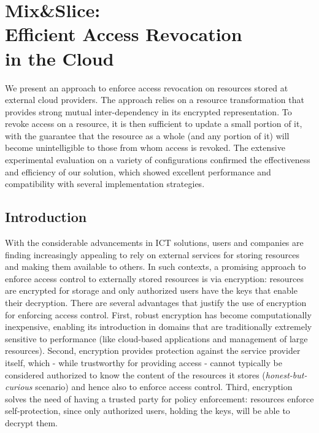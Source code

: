\chapter[Mix\&Slice]{Mix\&Slice:\\Efficient Access Revocation\\in the Cloud}\label{chap:ms}

We present an approach to enforce access revocation on resources stored at external cloud providers. The approach relies on a resource transformation that provides strong mutual inter-dependency in its encrypted representation. To revoke access on a resource, it is then sufficient to update a small portion of it, with the guarantee that the resource as a whole (and any portion of it) will become unintelligible to those from whom access is revoked. The extensive experimental evaluation on a variety of configurations confirmed the effectiveness and efficiency of our solution, which showed excellent performance and compatibility with several implementation strategies.

\section{Introduction}\label{ms:sec:intro}

With the considerable advancements in ICT solutions, users and companies are finding increasingly appealing to rely on external services for storing resources and making them available to others. In such contexts, a promising approach to enforce access control to externally stored resources is via encryption: resources are encrypted for storage and only authorized users have the keys that enable their decryption. There are several advantages that justify the use of encryption for enforcing access control. First, robust encryption has become computationally inexpensive, enabling its introduction in domains that are traditionally extremely sensitive to performance (like cloud-based applications and management of large resources). Second, encryption provides protection against the service provider itself, which - while trustworthy for providing access - cannot typically be considered authorized to know the content of the resources it stores ({\em honest-but-curious\/} scenario) and hence also to enforce access control. Third, encryption solves the need of having a trusted party for policy enforcement: resources enforce self-protection, since only authorized users, holding the keys, will be able to decrypt them.
 

